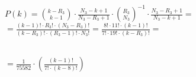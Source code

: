 \documentclass{article}
\begin{document}
\\
\begin{center}
\begin{math}
P(k) = \displaystyle{k - R_3 \choose k - 1} \cdot
\displaystyle\frac{N_3 - k + 1}{N_3 - R_3 + 1} \cdot \displaystyle{R_3 \choose N_3}^{-1} \cdot \displaystyle\frac{N_3 - R_3 + 1}{N_3 - k + 1} = 
\end{math}
\vspace{\baselineskip}
\\
\begin{math}
 = \displaystyle\frac{(k-1)! \cdot R_3! \cdot (N_3 - R_3)!}{(k - R_3)! \cdot (R_3 - 1)! \cdot N_3!} = \displaystyle\frac{8! \cdot 11! \cdot (k-1)!}{ 7! \cdot 19!\cdot (k - R_3)!}
 = \end{math}

 \vspace{\baselineskip}
\\
 \begin{math} =\displaystyle\frac{1}{75582} \cdot \left( \displaystyle\frac{(k-1)!}{7! \cdot (k - 8)!} \right)\end{math}
  \end{center}
\vspace{\baselineskip}
\\
\end{document}
